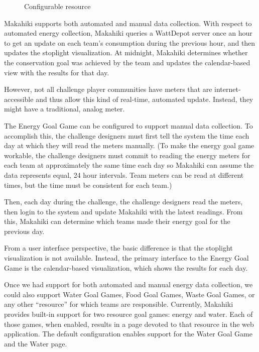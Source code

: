 \begin{figure}[!ht]
	\centering
		\caption{Configurable resource}
		\label{fig:resource}
\end{figure}

Makahiki supports both automated and manual data collection. With respect to automated energy collection, Makahiki queries a WattDepot server once an hour to get an update on each team's consumption during the previous hour, and then updates the stoplight visualization. At midnight, Makahiki determines whether the conservation goal was achieved by the team and updates the calendar-based view with the results for that day.

However, not all challenge player communities have meters that are internet-accessible and thus allow this kind of real-time, automated update. Instead, they might have a traditional, analog meter.

The Energy Goal Game can be configured to support manual data collection. To accomplish this, the challenge designers must first tell the system the time each day at which they will read the meters manually. (To make the energy goal game workable, the challenge designers must commit to reading the energy meters for each team at approximately the same time each day so Makahiki can assume the data represents equal, 24 hour intervals. Team meters can be read at different times, but the time must be consistent for each team.)

Then, each day during the challenge, the challenge designers read the meters, then login to the system and update Makahiki with the latest readings. From this, Makahiki can determine which teams made their energy goal for the previous day.

From a user interface perspective, the basic difference is that the stoplight visualization is not available. Instead, the primary interface to the Energy Goal Game is the calendar-based visualization, which shows the results for each day.

Once we had support for both automated and manual energy data collection,  we could also support Water Goal Games, Food Goal Games, Waste Goal Games, or any other ``resource'' for which teams are responsible. Currently, Makahiki provides built-in support for two resource goal games: energy and water. Each of those games, when enabled, results in a page devoted to that resource in the web application. The default configuration enables support for the Water Goal Game and the Water page.

